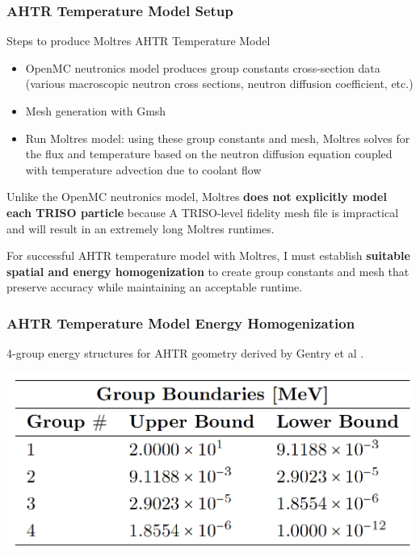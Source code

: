\begin{frame}
    \frametitle{AHTR Temperature Model Setup}
    Steps to produce Moltres AHTR Temperature Model
        \begin{itemize}
          \item OpenMC neutronics model produces group constants cross-section data 
          (various macroscopic neutron cross sections, neutron diffusion coefficient, etc.)
          \item Mesh generation with Gmsh \cite{geuzaine_gmsh_2009}
          \item Run Moltres model: using these group constants and mesh, Moltres solves for the 
          flux and temperature based on the neutron diffusion equation coupled with temperature 
          advection due to coolant flow
        \end{itemize}

    \vspace{0.3cm}
    Unlike the OpenMC neutronics model, Moltres \textbf{does not explicitly model each TRISO 
    particle} because A TRISO-level fidelity mesh file is impractical and will result in an 
    extremely long Moltres runtimes. 
    
    \vspace{0.3cm}
    For successful AHTR temperature model with Moltres, I must establish 
    \textbf{suitable spatial and energy homogenization} to create group constants and mesh 
    that preserve accuracy while maintaining an acceptable runtime.
\end{frame}

\begin{frame}
    \frametitle{AHTR Temperature Model Energy Homogenization}
        \begin{table}[]
            \centering
            \caption{4-group energy structures for AHTR geometry 
            derived by Gentry et al \cite{gentry_development_2016}.}
            \includegraphics[width=0.6\linewidth]{figures/ahtr-energy-discr.png}
        \end{table}
\end{frame}

